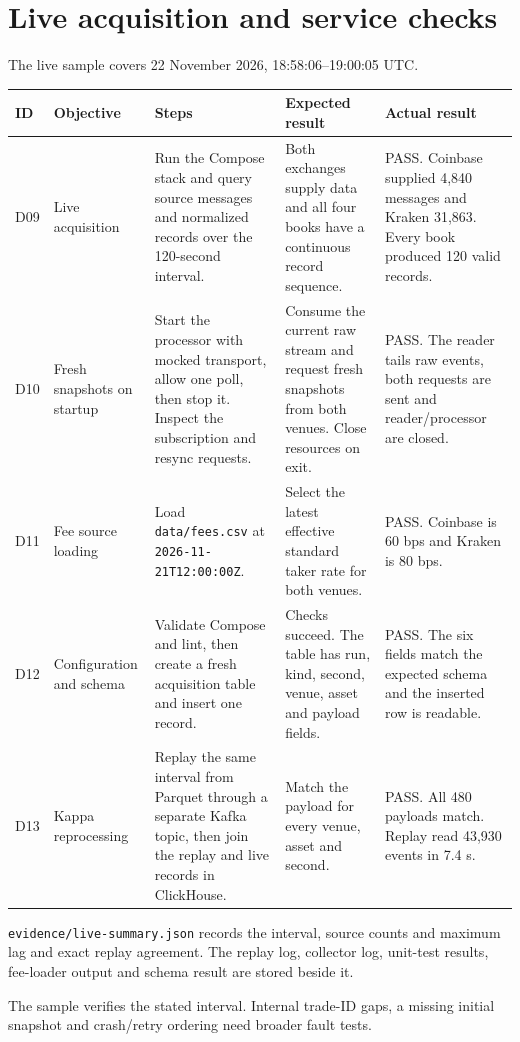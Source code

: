 \documentclass[10pt,a4paper]{article}
\begin{document}
\newpage
\section{Live acquisition and service checks}
The live sample covers 22 November 2026, 18:58:06--19:00:05 UTC.\par

\small
\begin{tabularx}{\linewidth}{@{}P{7mm}P{25mm}LLL@{}}
\toprule
\textbf{ID} & \textbf{Objective} & \textbf{Steps} & \textbf{Expected result} & \textbf{Actual result}\\
\midrule
D09 & Live acquisition & Run the Compose stack and query source messages and normalized records over the 120-second interval. & Both exchanges supply data and all four books have a continuous record sequence. & PASS. Coinbase supplied 4,840 messages and Kraken 31,863. Every book produced 120 valid records.\\\addlinespace
D10 & Fresh snapshots on startup & Start the processor with mocked transport, allow one poll, then stop it. Inspect the subscription and resync requests. & Consume the current raw stream and request fresh snapshots from both venues. Close resources on exit. & PASS. The reader tails raw events, both requests are sent and reader/processor are closed.\\\addlinespace
D11 & Fee source loading & Load \texttt{data/fees.csv} at \texttt{2026-11-21T12:00:00Z}. & Select the latest effective standard taker rate for both venues. & PASS. Coinbase is 60 bps and Kraken is 80 bps.\\\addlinespace
D12 & Configuration and schema & Validate Compose and lint, then create a fresh acquisition table and insert one record. & Checks succeed. The table has run, kind, second, venue, asset and payload fields. & PASS. The six fields match the expected schema and the inserted row is readable.\\\addlinespace
D13 & Kappa reprocessing & Replay the same interval from Parquet through a separate Kafka topic, then join the replay and live records in ClickHouse. & Match the payload for every venue, asset and second. & PASS. All 480 payloads match. Replay read 43,930 events in 7.4 s.\\
\bottomrule
\end{tabularx}
\normalsize

\medskip
\texttt{evidence/live-summary.json} records the interval, source counts and maximum lag and exact replay agreement. The replay log, collector log, unit-test results, fee-loader output and schema result are stored beside it.

The sample verifies the stated interval. Internal trade-ID gaps, a missing initial snapshot and crash/retry ordering need broader fault tests.
\end{document}
